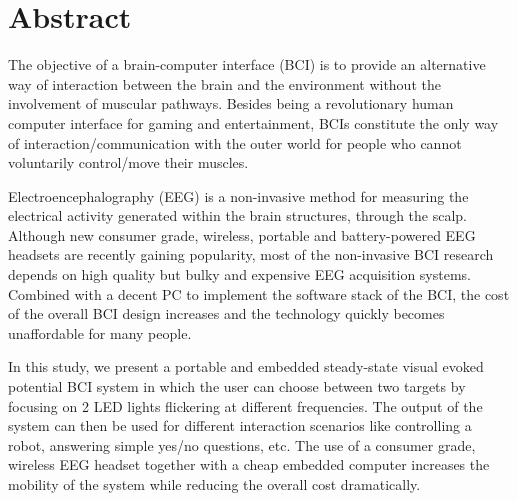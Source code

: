 \documentclass[12pt]{article}
\numberwithin{equation}{section}
\numberwithin{figure}{section}
\numberwithin{table}{section}
\begin{document}
\renewcommand\listfigurename{\normalsize\bfseries List of Figures}
\thispagestyle{empty}
\vspace*{0.15cm}
\listoffigures
\clearpage

\renewcommand\listtablename{\normalsize\bfseries List of Tables}
\thispagestyle{empty}
\vspace*{0.15cm}
\listoftables
\clearpage

\vspace*{-0.35cm}
\thispagestyle{empty}
\section*{Abstract}
\vspace*{6pt}

\par{
    The objective of a brain-computer interface (BCI) is to provide an alternative way of interaction between the brain and the environment
    without the involvement of muscular pathways. Besides being a revolutionary human computer interface for gaming and entertainment,
    BCIs constitute the only way of interaction/communication with the outer world for people who cannot voluntarily control/move their muscles.
}
\par{
    Electroencephalography (EEG) is a non-invasive method for measuring the electrical activity generated within the brain structures, through the scalp.
    Although new consumer grade, wireless, portable and battery-powered EEG headsets are recently gaining popularity,
    most of the non-invasive BCI research depends on high quality but bulky and expensive EEG acquisition systems.
    Combined with a decent PC to implement the software stack of the BCI, the cost of the overall
    BCI design increases and the technology quickly becomes unaffordable for many people.
}
\par{
    In this study, we present a portable and embedded steady-state visual evoked potential BCI
    system in which the user can choose between two targets by focusing on 2 LED lights flickering
    at different frequencies. The output of the system can then be used for different
    interaction scenarios like controlling a robot, answering simple yes/no questions, etc.
    The use of a consumer grade, wireless EEG headset together with a cheap embedded computer
    increases the mobility of the system while reducing the overall cost dramatically.
}
\end{document}
